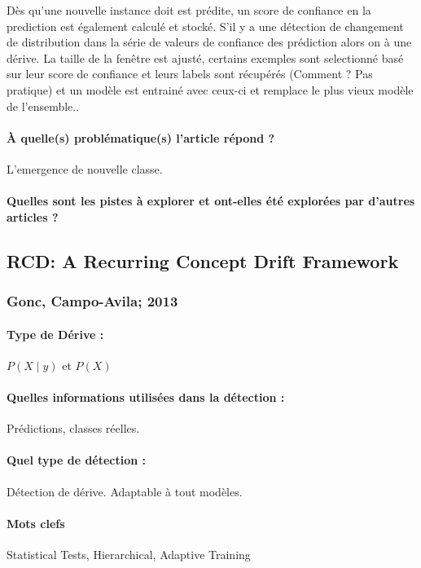 \documentclass[11pt,a4paper]{report}
\begin{document}
Dès qu'une nouvelle instance doit est prédite, un score de confiance en la prediction est également calculé et stocké. S'il y a une détection de changement de distribution dans la série de valeurs de confiance des prédiction alors on à une dérive. La taille de la fenêtre est ajusté, certains exemples sont selectionné basé sur leur score de confiance et leurs labels sont récupérés (Comment ? Pas pratique) et un modèle est entrainé avec ceux-ci et remplace le plus vieux modèle de l'ensemble..

\paragraph{À quelle(s) problématique(s) l'article répond ?} L'emergence de nouvelle classe.

\paragraph{Quelles sont les pistes à explorer et ont-elles  été explorées par d'autres articles ?}





\subsection{RCD: A Recurring Concept Drift Framework}
\subsubsection{Gonc, Campo-Avila; 2013}

\paragraph{Type de Dérive :} $P(X\mid y)$ et $P(X)$
\paragraph{Quelles informations utilisées dans la détection :} Prédictions, classes réelles.
\paragraph{Quel type de détection :} Détection de dérive. Adaptable à tout modèles.

\paragraph{Mots clefs} Statistical Tests, Hierarchical, Adaptive Training
\end{document}
